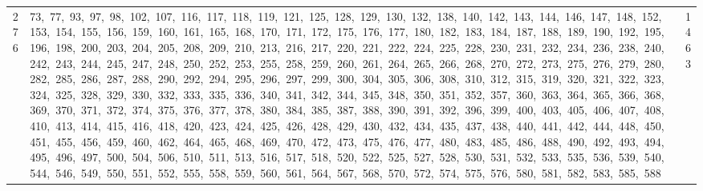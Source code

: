 \begin{longtable}{c|p{}|r}
276 & 73,\ 77,\ 93,\ 97,\ 98,\ 102,\ 107,\ 116,\ 117,\ 118,\ 119,\ 121,\ 125,\ 128,\ 129,\ 130,\ 132,\ 138,\ 140,\ 142,\ 143,\ 144,\ 146,\ 147,\ 148,\ 152,\ 153,\ 154,\ 155,\ 156,\ 159,\ 160,\ 161,\ 165,\ 168,\ 170,\ 171,\ 172,\ 175,\ 176,\ 177,\ 180,\ 182,\ 183,\ 184,\ 187,\ 188,\ 189,\ 190,\ 192,\ 195,\ 196,\ 198,\ 200,\ 203,\ 204,\ 205,\ 208,\ 209,\ 210,\ 213,\ 216,\ 217,\ 220,\ 221,\ 222,\ 224,\ 225,\ 228,\ 230,\ 231,\ 232,\ 234,\ 236,\ 238,\ 240,\ 242,\ 243,\ 244,\ 245,\ 247,\ 248,\ 250,\ 252,\ 253,\ 255,\ 258,\ 259,\ 260,\ 261,\ 264,\ 265,\ 266,\ 268,\ 270,\ 272,\ 273,\ 275,\ 276,\ 279,\ 280,\ 282,\ 285,\ 286,\ 287,\ 288,\ 290,\ 292,\ 294,\ 295,\ 296,\ 297,\ 299,\ 300,\ 304,\ 305,\ 306,\ 308,\ 310,\ 312,\ 315,\ 319,\ 320,\ 321,\ 322,\ 323,\ 324,\ 325,\ 328,\ 329,\ 330,\ 332,\ 333,\ 335,\ 336,\ 340,\ 341,\ 342,\ 344,\ 345,\ 348,\ 350,\ 351,\ 352,\ 357,\ 360,\ 363,\ 364,\ 365,\ 366,\ 368,\ 369,\ 370,\ 371,\ 372,\ 374,\ 375,\ 376,\ 377,\ 378,\ 380,\ 384,\ 385,\ 387,\ 388,\ 390,\ 391,\ 392,\ 396,\ 399,\ 400,\ 403,\ 405,\ 406,\ 407,\ 408,\ 410,\ 413,\ 414,\ 415,\ 416,\ 418,\ 420,\ 423,\ 424,\ 425,\ 426,\ 428,\ 429,\ 430,\ 432,\ 434,\ 435,\ 437,\ 438,\ 440,\ 441,\ 442,\ 444,\ 448,\ 450,\ 451,\ 455,\ 456,\ 459,\ 460,\ 462,\ 464,\ 465,\ 468,\ 469,\ 470,\ 472,\ 473,\ 475,\ 476,\ 477,\ 480,\ 483,\ 485,\ 486,\ 488,\ 490,\ 492,\ 493,\ 494,\ 495,\ 496,\ 497,\ 500,\ 504,\ 506,\ 510,\ 511,\ 513,\ 516,\ 517,\ 518,\ 520,\ 522,\ 525,\ 527,\ 528,\ 530,\ 531,\ 532,\ 533,\ 535,\ 536,\ 539,\ 540,\ 544,\ 546,\ 549,\ 550,\ 551,\ 552,\ 555,\ 558,\ 559,\ 560,\ 561,\ 564,\ 567,\ 568,\ 570,\ 572,\ 574,\ 575,\ 576,\ 580,\ 581,\ 582,\ 583,\ 585,\ 588 & 1463 \\

\end{longtable}
